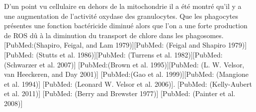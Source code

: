 $$D’un point vu cellulaire en dehors de la mitochondrie il a été montré qu’il y a une augmentation de l’activité oxydase des granulocytes. Que les phagocytes présentes une fonction bactéricide diminué alors que l’on a une forte production de ROS dû à la diminution du transport de chlore dans les phagosomes. [PubMed:(Shapiro, Feigal, and Lam 1979)][PubMed: (Feigal and Shapiro 1979)][PubMed: (Stutts et al. 1986)][PubMed: (Turrens et al. 1982)][PubMed: (Schwarzer et al. 2007)] [PubMed:(Brown et al. 1995)][PubMed: (L. W. Velsor, van Heeckeren, and Day 2001)] [PubMed:(Gao et al. 1999)][PubMed: (Mangione et al. 1994)] [PubMed: (Leonard W. Velsor et al. 2006)]. [PubMed: (Kelly-Aubert et al. 2011)] [PubMed: (Berry and Brewster 1977)] [PubMed: (Painter et al. 2008)] \cite{shapiro_mitrochondrial_1979} \cite{feigal_mitochondrial_1979} \cite{stutts_oxygen_1986}\cite{turrens_effect_1982}\cite{schwarzer_organelle_2007}\cite{brown_oxidative_1995}\cite{velsor_antioxidant_2001}\cite{gao_abnormal_1999}\cite{mangione_erythrocytic_1994}\cite{velsor_mitochondrial_2006}\cite{kelly-aubert_gsh_2011}\cite{berry_granulocyte_1977}\cite{painter_role_2008}

